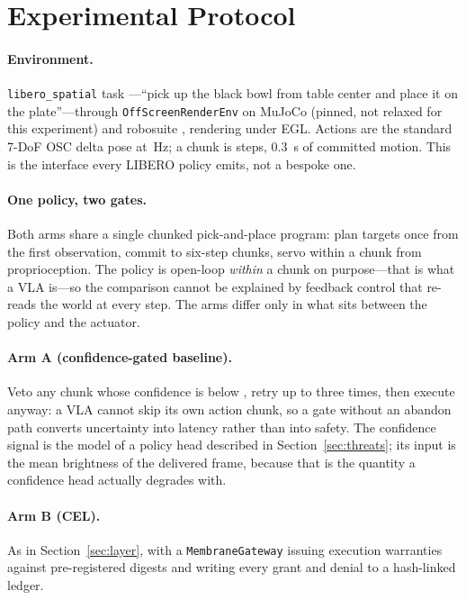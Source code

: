 \documentclass[conference]{IEEEtran}
\theoremstyle{definition}
\newcommand{\lib}{\texttt{libero\_spatial}}
\newcommand{\code}[1]{\texttt{#1}}
\begin{document}
\section{Experimental Protocol}
\label{sec:protocol}

\paragraph{Environment.} \lib{} task \TaskIndex{}---``pick up the black bowl
from table center and place it on the plate''---through
\code{OffScreenRenderEnv} on MuJoCo \MujocoVersion{} \cite{todorov2012mujoco}
(pinned, not relaxed for this experiment) and robosuite \RobosuiteVersion{}
\cite{zhu2020robosuite}, rendering under
EGL. Actions are the standard 7-DoF OSC delta pose at \ControlHz\,Hz; a chunk
is \ChunkSteps{} steps, \SI{0.3}{s} of committed motion. This is the interface
every LIBERO policy emits, not a bespoke one.

\paragraph{One policy, two gates.} Both arms share a single chunked
pick-and-place program: plan targets once from the first observation, commit to
six-step chunks, servo within a chunk from proprioception. The policy is
open-loop \emph{within} a chunk on purpose---that is what a VLA is---so the
comparison cannot be explained by feedback control that re-reads the world at
every step.
The arms differ only in what sits between the policy and the actuator.

\paragraph{Arm A (confidence-gated baseline).} Veto any chunk whose confidence is below
\ConfThreshold, retry up to three times, then execute anyway: a VLA cannot skip
its own action chunk, so a gate without an abandon path converts uncertainty
into latency rather than into safety. The confidence signal is the model of a
policy head described in Section~\ref{sec:threats}; its input is the mean
brightness of the delivered frame, because that is the quantity a confidence
head actually degrades with.

\paragraph{Arm B (CEL).} As in Section~\ref{sec:layer}, with a
\code{MembraneGateway} issuing execution warranties against pre-registered digests and
writing every grant and denial to a hash-linked ledger.
\end{document}
